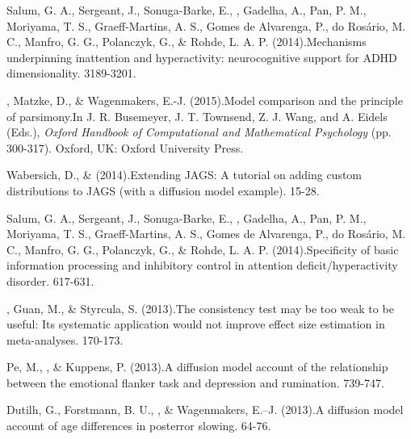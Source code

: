 \item[20.] Salum, G. A., Sergeant, J., Sonuga-Barke, E., \vdkh{}, Gadelha, A., Pan, P. M., Moriyama, T. S., Graeff-Martins, A. S., Gomes de Alvarenga, P., do Ros\'{a}rio, M. C., Manfro, G. G., Polanczyk, G., \& Rohde, L. A. P. (2014).\newblock Mechanisms underpinning inattention and hyperactivity: neurocognitive support for ADHD dimensionality. 3189-3201. %

\item[19.] \vdkh{}, Matzke, D., \& Wagenmakers, E.-J. (2015).\newblock Model comparison and the principle of parsimony.\newblock In J. R. Busemeyer, J. T. Townsend, Z. J. Wang, and A. Eidels (Eds.), {\em Oxford Handbook of Computational and Mathematical Psychology} (pp. 300-317). Oxford, UK: Oxford University Press. %

\item[18.] Wabersich, D., \& \vdkh{} (2014).\newblock Extending JAGS: A tutorial on adding custom distributions to JAGS (with a diffusion model example). 15-28. %

\item[17.] Salum, G. A., Sergeant, J., Sonuga-Barke, E., \vdkh{}, Gadelha, A., Pan, P. M., Moriyama, T. S., Graeff-Martins, A. S., Gomes de Alvarenga, P., do Ros\'{a}rio, M. C., Manfro, G. G., Polanczyk, G., \& Rohde, L. A. P. (2014).\newblock Specificity of basic information processing and inhibitory control in attention deficit/hyperactivity disorder. 617-631. %

\item[16.] \vdkh{}, Guan, M., \& Styrcula, S. (2013).\newblock The consistency test may be too weak to be useful: Its systematic application would not improve effect size estimation in meta-analyses. 170-173. %

\item[15.] Pe, M., \vdkh{}, \& Kuppens, P. (2013).\newblock A diffusion model account of the relationship between the emotional flanker task and depression and rumination. 739-747. %

\item[14.] Dutilh, G., Forstmann, B. U., \vdkh{}, \& Wagenmakers, E.--J. (2013).\newblock A diffusion model account of age differences in posterror slowing. 64-76. %

